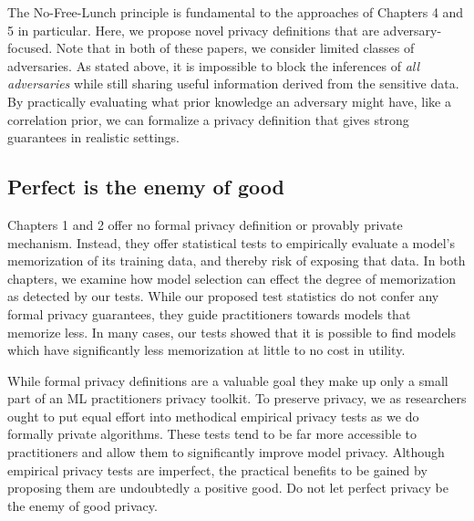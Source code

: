 The No-Free-Lunch principle is fundamental to the approaches of Chapters 4 and 5 in particular. Here, we propose novel privacy definitions that are adversary-focused. Note that in both of these papers, we consider limited classes of adversaries. As stated above, it is impossible to block the inferences of \emph{all adversaries} while still sharing useful information derived from the sensitive data. By practically evaluating what prior knowledge an adversary might have, like a correlation prior, we can formalize a privacy definition that gives strong guarantees in realistic settings. 

\subsection*{Perfect is the enemy of good}
Chapters 1 and 2 offer no formal privacy definition or provably private mechanism. Instead, they offer statistical tests to empirically evaluate a model's memorization of its training data, and thereby risk of exposing that data. In both chapters, we examine how model selection can effect the degree of memorization as detected by our tests. While our proposed test statistics do not confer any formal privacy guarantees, they guide practitioners towards models that memorize less. In many cases, our tests showed that it is possible to find models which have significantly less memorization at little to no cost in utility. 

While formal privacy definitions are a valuable goal they make up only a small part of an ML practitioners privacy toolkit. To preserve privacy, we as researchers ought to put equal effort into methodical empirical privacy tests as we do formally private algorithms. These tests tend to be far more accessible to practitioners and allow them to significantly improve model privacy. Although empirical privacy tests are imperfect, the practical benefits to be gained by proposing them are undoubtedly a positive good. Do not let perfect privacy be the enemy of good privacy. 